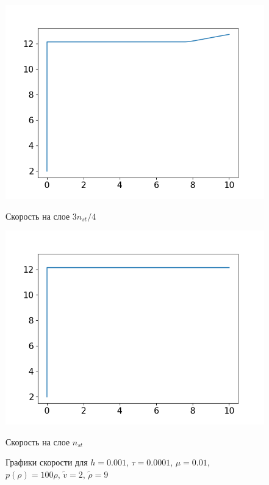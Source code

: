 \begin{figure}[h]
\begin{minipage}[h]{0.47\linewidth}
		\includegraphics[width=1\linewidth]{pics/task4/34u_2.png} 
		\caption{Скорость на слое $3n_{st} / 4$}
	\end{minipage}
	\hfill
	\begin{minipage}[h]{0.47\linewidth}
		\centering
		\includegraphics[width=1\linewidth]{pics/task4/44u_2.png} 
		\caption{Скорость на слое $n_{st}$}
	\end{minipage}
	\caption{Графики скорости для $h = 0.001$, $\tau = 0.0001$, $\mu = 0.01$, $p(\rho) = 100\rho$, $\tilde{v} = 2$, $\tilde{\rho} = 9 $}
\end{figure}

